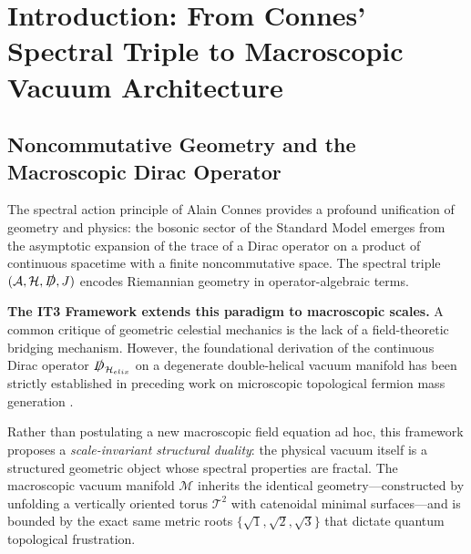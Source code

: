 \documentclass[11pt,a4paper]{article}
\theoremstyle{remark}
\newcommand{\cT}{\mathcal{T}}
\newcommand{\cH}{\mathcal{H}}
\newcommand{\cA}{\mathcal{A}}
\newcommand{\cM}{\mathcal{M}}
\newcommand{\slashedD}{\slashed{D}}
\begin{document}
\section{Introduction: From Connes' Spectral Triple to Macroscopic Vacuum Architecture}

\subsection{Noncommutative Geometry and the Macroscopic Dirac Operator}

The spectral action principle of Alain Connes \cite{connes1994,chamseddine1997} provides a profound unification of geometry and physics: the bosonic sector of the Standard Model emerges from the asymptotic expansion of the trace of a Dirac operator on a product of continuous spacetime with a finite noncommutative space. The spectral triple $(\cA, \cH, \slashedD, J)$ encodes Riemannian geometry in operator-algebraic terms.

\textbf{The IT3 Framework extends this paradigm to macroscopic scales.} A common critique of geometric celestial mechanics is the lack of a field-theoretic bridging mechanism. However, the foundational derivation of the continuous Dirac operator $\slashedD_{\cH_{elix}}$ on a degenerate double-helical vacuum manifold has been strictly established in preceding work on microscopic topological fermion mass generation \cite{logvinovich2026}. 

Rather than postulating a new macroscopic field equation ad hoc, this framework proposes a \textit{scale-invariant structural duality}: the physical vacuum itself is a structured geometric object whose spectral properties are fractal. The macroscopic vacuum manifold $\cM$ inherits the identical geometry---constructed by unfolding a vertically oriented torus $\cT^2$ with catenoidal minimal surfaces---and is bounded by the exact same metric roots $\{\sqrt{1}, \sqrt{2}, \sqrt{3}\}$ that dictate quantum topological frustration.
\end{document}
